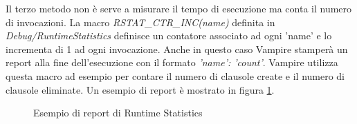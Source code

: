 \documentclass[./main.tex]{subfiles}
\begin{document}
Il terzo metodo non è serve a misurare il tempo di esecuzione ma conta il numero di invocazioni.
La macro \textit{RSTAT\_CTR\_INC(name)} definita in \textit{Debug/RuntimeStatistics} definisce 
un contatore associato ad ogni 'name' e lo incrementa di 1 ad ogni invocazione.
Anche in questo caso Vampire stamperà un report alla fine dell'esecuzione con il formato \textit{'name': 'count'}.
Vampire utilizza questa macro ad esempio per contare il numero di clausole create e il numero di clausole eliminate.
Un esempio di report è mostrato in figura \ref{fig:rstat_report}.

\begin{figure}[h]
    \centering
    \caption{Esempio di report di Runtime Statistics}
    \label{fig:rstat_report}
\end{figure}


  
\end{document}
